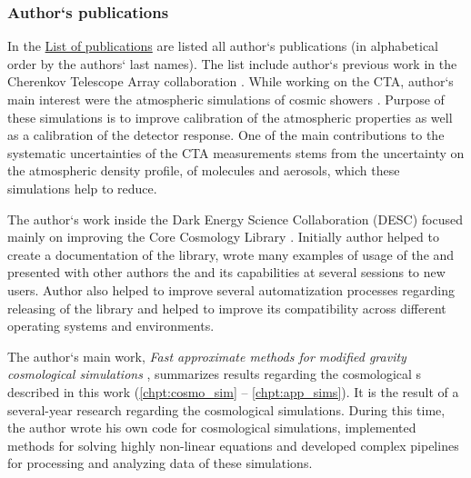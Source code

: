 \subsubsection{Author`s publications}
\begin{refsection}
In the \hyperref[chpt:list_publish]{List of publications} are listed all author`s publications (in alphabetical order by the authors` last names). The list include author`s previous work in the Cherenkov Telescope Array collaboration \parencite{2016arXiv161005151C,2017arXiv170903483A,2017ApJ...840...74A,2019scta.book.....C}. While working on the CTA, author`s main interest were the atmospheric simulations of cosmic showers \parencite{2017EPJWC.14401014V,}. Purpose of these simulations is to improve calibration of the atmospheric properties as well as a calibration of the detector response. One of the main contributions to the systematic uncertainties of the CTA measurements stems from the uncertainty on the atmospheric density profile, of molecules and aerosols, which these simulations help to reduce.

The author`s work inside the Dark Energy Science Collaboration (DESC) focused mainly on improving the Core Cosmology Library \parencite[,][]{2019ascl.soft01003C,2019ApJS..242....2C}. Initially author helped to create a documentation of the library, wrote many examples of usage of the  and presented with other authors the  and its capabilities at several sessions to new users. Author also helped to improve several automatization processes regarding releasing of the library and helped to improve its compatibility across different operating systems and environments.

The author`s main work, \textit{Fast approximate methods for modified gravity cosmological simulations} \parencite[published in Monthly Notices of the Royal Astronomical Society,][]{2020MNRAS.493.2085V}, summarizes results regarding the cosmological \nbodysim s described in this work (\autoref{chpt:cosmo_sim} -- \autoref{chpt:app_sims}). It is the result of a several-year research regarding the cosmological simulations. During this time, the author wrote his own code for cosmological simulations, implemented methods for solving highly non-linear equations and developed complex pipelines for processing and analyzing data of these simulations.
\end{refsection}
